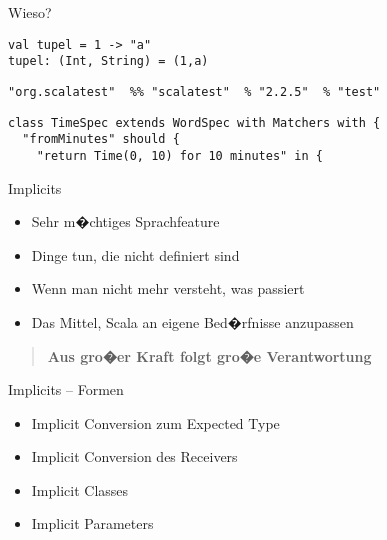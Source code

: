 \documentclass[14pt,aspectratio=169,trans]{beamer} %
\begin{document}
\begin{frame}[fragile]{}
	\begin{block}{Wieso?}
		\scriptsize
		\onslide<2->
  \begin{lstlisting}
val tupel = 1 -> "a"
tupel: (Int, String) = (1,a)
	\end{lstlisting}
\begin{lstlisting}[firstnumber=3]
"org.scalatest"  %% "scalatest"  % "2.2.5"  % "test"
\end{lstlisting}
\begin{lstlisting}[firstnumber=4]
class TimeSpec extends WordSpec with Matchers with {
  "fromMinutes" should {
    "return Time(0, 10) for 10 minutes" in {
\end{lstlisting}
	\end{block}
\end{frame}

\begin{frame}{}
	\begin{block}{Implicits}
		\begin{itemize}
			\item<2->Sehr m�chtiges Sprachfeature
			\item<3->Dinge tun, die nicht definiert sind
			\item<4->Wenn man nicht mehr versteht, was passiert
			\item<5->Das Mittel, Scala an eigene Bed�rfnisse anzupassen
		\end{itemize}
	\end{block}
	\note{}
\end{frame}

\begin{frame}{}
  \begin{quote}
		{\large\textbf{Aus gro�er Kraft folgt gro�e Verantwortung}}
		\vskip3mm
		\hspace*{}
	\end{quote}
	\note{
}
\end{frame}

\begin{frame}{}
	\begin{block}{Implicits -- Formen}
		\begin{itemize}
			\item<2->Implicit Conversion zum Expected Type
			\item<3->Implicit Conversion des Receivers
			\item<4->Implicit Classes
			\item<5->Implicit Parameters
		\end{itemize}
	\end{block}
	\note{}
\end{frame}
\end{document}
